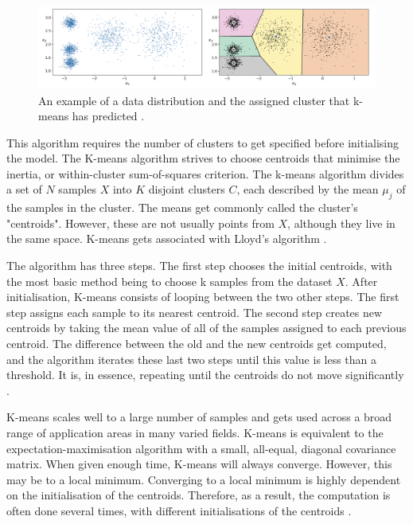 	\begin{figure}[t]
		\begin{center}
			\includegraphics[width=15cm]{graphics/km_example.png}
			\caption{An example of a data distribution and the assigned cluster that k-means has predicted \cite{geron2019hands}.}
			\label{fig:km_handson_example}
		\end{center}
	\end{figure}
	
	This algorithm requires the number of clusters to get specified before initialising the model. The K-means algorithm strives to choose centroids that minimise the inertia, or within-cluster sum-of-squares criterion. The k-means algorithm divides a set of $N$ samples $X$ into $K$ disjoint clusters $C$, each described by the mean $\mu_j$ of the samples in the cluster. The means get commonly called the cluster's "centroids". However, these are not usually points from $X$, although they live in the same space. K-means gets associated with Lloyd's algorithm \cite{geron2019hands, sklearn_km}. 
	
	The algorithm has three steps. The first step chooses the initial centroids, with the most basic method being to choose k samples from the dataset $X$. After initialisation, K-means consists of looping between the two other steps. The first step assigns each sample to its nearest centroid. The second step creates new centroids by taking the mean value of all of the samples assigned to each previous centroid. The difference between the old and the new centroids get computed, and the algorithm iterates these last two steps until this value is less than a threshold. It is, in essence, repeating until the centroids do not move significantly \cite{geron2019hands, sklearn_km}.
	
	K-means scales well to a large number of samples and gets used across a broad range of application areas in many varied fields. K-means is equivalent to the expectation-maximisation algorithm with a small, all-equal, diagonal covariance matrix. When given enough time, K-means will always converge. However, this may be to a local minimum. Converging to a local minimum is highly dependent on the initialisation of the centroids. Therefore, as a result, the computation is often done several times, with different initialisations of the centroids \cite{sklearn_km}.
	
